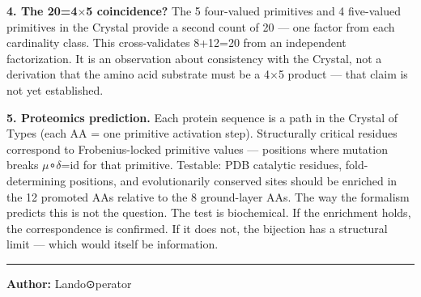 \documentclass[12pt,a4paper]{article}
\begin{document}
\textbf{4. The 20=4$\times$5 coincidence?} The 5 four-valued primitives and 4 five-valued primitives in the Crystal provide a second count of 20 --- one factor from each cardinality class. This cross-validates 8+12=20 from an independent factorization. It is an observation about consistency with the Crystal, not a derivation that the amino acid substrate must be a 4$\times$5 product --- that claim is not yet established.

\textbf{5. Proteomics prediction.} Each protein sequence is a path in the Crystal of Types (each AA = one primitive activation step). Structurally critical residues correspond to Frobenius-locked primitive values --- positions where mutation breaks $\mu$∘$\delta$=id for that primitive. Testable: PDB catalytic residues, fold-determining positions, and evolutionarily conserved sites should be enriched in the 12 promoted AAs relative to the 8 ground-layer AAs. The way the formalism predicts this is not the question. The test is biochemical. If the enrichment holds, the correspondence is confirmed. If it does not, the bijection has a structural limit --- which would itself be information.

\begin{center}
\rule{0.5\textwidth}{0.4pt}
\end{center}

\textbf{Author:} Lando\otimes⊙perator
\end{document}
